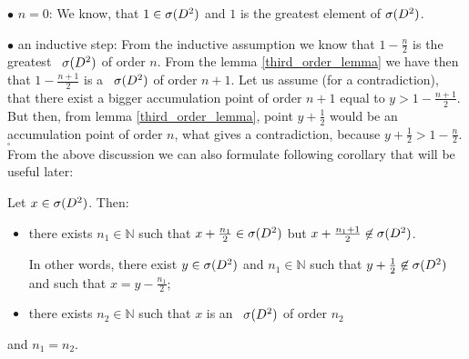 $\bullet$ $n=0$: We know, that $1\in {{\sigma}(D^2)}$ and $1$ is the greatest element of ${{\sigma}(D^2)}$. 

$\bullet$ an inductive step: From the inductive assumption we know that $1-\frac{n}{2}$ is 
the greatest \apots\ ${{\sigma}(D^2)}$ of order $n$. From the lemma \ref{third_order_lemma} we have then 
that $1-\frac{n+1}{2}$ is a \apots\ ${{\sigma}(D^2)}$ of order $n+1$. Let us assume (for a contradiction), 
that there exist a bigger accumulation point of order $n+1$ equal to $y > 1-\frac{n+1}{2}$. 
But then, from lemma \ref{third_order_lemma}, point $y+\frac{1}{2}$ would be an accumulation 
point 
of order $n$, what gives a contradiction, because $y+\frac{1}{2}>1-\frac{n}{2}$. $_\square$ 
\\[8pt]
From the above discussion we can also formulate following corollary that will be useful later: 
\begin{corollary}\label{predescors}
Let $x \in {{\sigma}(D^2)}$. Then:
\begin{itemize}
\item there exists $n_1 \in \mathbb{N}$ such that $x + \frac{n_1}{2} \in {{\sigma}(D^2)}$ 
but $x+\frac{n_1+1}{2} \not\in {{\sigma}(D^2)}$. 

In other words, there exist $y \in {{\sigma}(D^2)}$ and 
$n_1 \in \mathbb{N}$ such that 
$y + \frac{1}{2} \not\in {{\sigma}(D^2)}$ and such that $x = y - \frac{n_1}{2}$;
\item there exists $n_2 \in \mathbb{N}$ such that $x$ is an \apots\ ${{\sigma}(D^2)}$ of 
order $n_2$
\end{itemize}
and $n_1 = n_2$.
\end{corollary}

